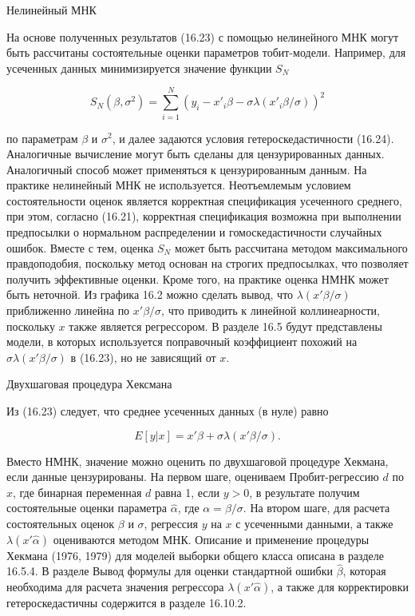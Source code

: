 Нелинейный МНК

На основе полученных результатов (16.23) с помощью нелинейного МНК могут быть рассчитаны состоятельные оценки параметров тобит-модели. Например, для усеченных данных минимизируется значение функции $S_N$

\[
S_{N}(\beta,\sigma^2)=\sum^N_{i=1}\left(y_{i}-{x'}_{i}{\beta}-{\sigma}{\lambda}({x'}_{i}{\beta}/{\sigma})\right)^2
\]

по параметрам $\beta$ и ${\sigma}^2$, и далее задаются условия гетероскедастичности (16.24). Аналогичные вычисление могут быть сделаны для цензурированных данных. Аналогичный способ может применяться к цензурированным данным.
На практике нелинейный МНК не используется. Неотъемлемым условием состоятельности оценок является корректная спецификация усеченного среднего, при этом, согласно (16.21), корректная спецификация возможна при выполнении предпосылки о нормальном распределении и гомоскедастичности случайных ошибок. Вместе с тем, оценка $S_N$ может быть рассчитана методом максимального правдоподобия, поскольку метод основан на строгих предпосылках, что позволяет получить эффективные оценки. Кроме того, на практике оценка НМНК может быть неточной. Из графика 16.2 можно сделать вывод, что $\lambda(x'\beta/\sigma)$ приближенно линейна по $x'\beta/\sigma$, что приводить к линейной коллинеарности, поскольку $x$ также является регрессором. В разделе 16.5 будут представлены модели, в которых используется поправочный коэффициент похожий на $\sigma\lambda(x'\beta/\sigma)$ в (16.23), но не зависящий от $x$.


Двухшаговая процедура Хексмана

Из (16.23) следует, что среднее усеченных данных (в нуле) равно

\begin{equation}
E[y|x]=x'\beta+\sigma\lambda(x'\beta/\sigma).
\end{equation}

Вместо НМНК, значение можно оценить по двухшаговой процедуре Хекмана, если данные цензурированы. На первом шаге, оцениваем Пробит-регрессию $d$ по $x$, где бинарная переменная $d$ равна 1, если $y>0$, в результате получим состоятельные оценки параметра $\hat{\alpha}$, где $\alpha=\beta/\sigma$. На втором шаге, для расчета состоятельных оценок $\beta$ и $\sigma$, регрессия $y$ на $x$ с усеченными данными, а также $\lambda(x'\hat{\alpha})$ оцениваются методом МНК.
Описание и применение процедуры Хекмана (1976, 1979) для моделей выборки общего класса описана в разделе 16.5.4. В разделе 
Вывод формулы для оценки стандартной ошибки $\hat{\beta}$, которая необходима для расчета значения регрессора $\lambda(x'\hat{\alpha})$, а также для корректировки гетероскедастичны содержится в разделе 16.10.2.

